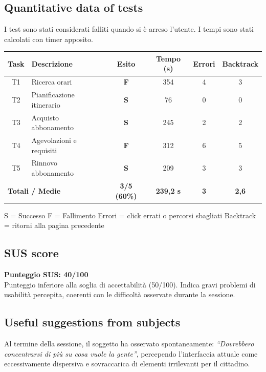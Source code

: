 ﻿\documentclass[11pt,a4paper]{article}
\begin{document}
\subsection*{Quantitative data of tests}
\begin{tcolorbox}[base]
I test sono stati considerati falliti quando si è arreso l'utente.
I tempi sono stati calcolati con timer apposito.
\begin{center}
\renewcommand{\arraystretch}{1.4}
\begin{tabular}{clcccc}
\toprule
\textbf{Task} & \textbf{Descrizione} &
\textbf{Esito} & \textbf{Tempo (s)} &
\textbf{Errori} & \textbf{Backtrack} \\
\midrule
T1 & Ricerca orari        & \textbf{F} & 354 & 4 & 3 \\
T2 & Pianificazione itinerario & \textbf{S} & 76 & 0 & 0 \\
T3 & Acquisto abbonamento & \textbf{S} & 245 & 2 & 2 \\
T4 & Agevolazioni e requisiti & \textbf{F} & 312 & 6 & 5 \\
T5 & Rinnovo abbonamento  & \textbf{S} & 209 & 3 & 3 \\
\midrule
\multicolumn{2}{l}{\textbf{Totali / Medie}} &
\textbf{3/5 (60\%)} & \textbf{239,2 s} &
\textbf{3} & \textbf{2,6} \\
\bottomrule
\end{tabular}
\end{center}

\vspace{0.3cm}
\small S = Successo \quad F = Fallimento \quad
Errori = click errati o percorsi sbagliati \quad
Backtrack = ritorni alla pagina precedente
\end{tcolorbox}

\subsection*{SUS score}
\begin{tcolorbox}[base]
\textbf{Punteggio SUS: 40/100}\\[0.2cm]
\small Punteggio inferiore alla soglia di accettabilità
(50/100). Indica gravi problemi di usabilità percepita,
coerenti con le difficoltà osservate durante la sessione.
\end{tcolorbox}

\subsection*{Useful suggestions from subjects}
\begin{tcolorbox}[base]
Al termine della sessione, il soggetto ha osservato spontaneamente: \textit{``Dovrebbero concentrarsi di più su cosa vuole la gente''}, percependo l'interfaccia attuale come eccessivamente dispersiva e sovraccarica di elementi irrilevanti per il cittadino. 
\end{tcolorbox}
\end{document}
